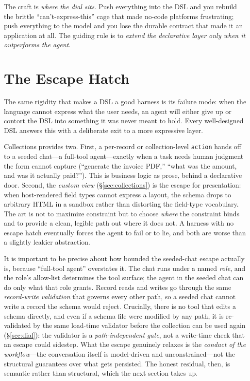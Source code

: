 \documentclass[11pt]{article}
\newcommand{\code}[1]{\texttt{\small #1}}
\begin{document}
The craft is \emph{where the dial sits}. Push everything into the DSL and you
rebuild the brittle ``can't-express-this'' cage that made no-code platforms
frustrating; push everything to the model and you lose the durable contract that
made it an application at all. The guiding rule is to \emph{extend the declarative
layer only when it outperforms the agent}.

\section{The Escape Hatch}
\label{sec:escape}

The same rigidity that makes a DSL a good harness is its failure mode: when the
language cannot express what the user needs, an agent will either give up or
contort the DSL into something it was never meant to hold. Every well-designed DSL
answers this with a deliberate exit to a more expressive layer.

Collections provides two. First, a per-record or collection-level \code{action}
hands off to a seeded chat---a full-tool agent---exactly when a task needs human
judgment the form cannot capture (``generate the invoice PDF,'' ``what was the
amount, and was it actually paid?''). This is business logic as prose, behind a
declarative door. Second, the \emph{custom view} (\S\ref{sec:collections}) is the
escape for presentation: when host-rendered field types cannot express a layout,
the schema drops to arbitrary HTML in a sandbox rather than distorting the
field-type vocabulary. The art is not to maximize constraint but to choose
\emph{where} the constraint binds and to provide a clean, legible path out where it
does not. A harness with no escape hatch eventually forces the agent to fail or to
lie, and both are worse than a slightly leakier abstraction.

It is important to be precise about how bounded the seeded-chat escape actually is,
because ``full-tool agent'' overstates it. The chat runs under a named \emph{role},
and the role's allow-list determines the tool surface; the agent in the seeded chat
can do only what that role grants. Record reads and writes go through the same
\emph{record-write validation} that governs every other path, so a seeded chat
cannot write a record the schema would reject. Crucially, there is no tool that
edits a schema directly, and even if a schema file were modified by any path, it is
re-validated by the same load-time validator before the collection can be used
again (\S\ref{sec:dial}): the validator is a \emph{path-independent gate}, not a
write-time check that an escape could sidestep. What the escape genuinely relaxes is
the \emph{conduct of the workflow}---the conversation itself is model-driven and
unconstrained---not the structural guarantees over what gets persisted. The
honest residual, then, is semantic rather than structural, which the next section
takes up.
\end{document}
